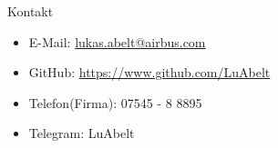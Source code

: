\begin{frame}{Kontakt}{}
	\begin{itemize}
		\item E-Mail: \href{mailto:lukas.abelt@airbus.com}{lukas.abelt@airbus.com}
		\item GitHub: \url{https://www.github.com/LuAbelt}
		\item Telefon(Firma): 07545 - 8 8895
		\item Telegram: LuAbelt
	\end{itemize}
\end{frame}